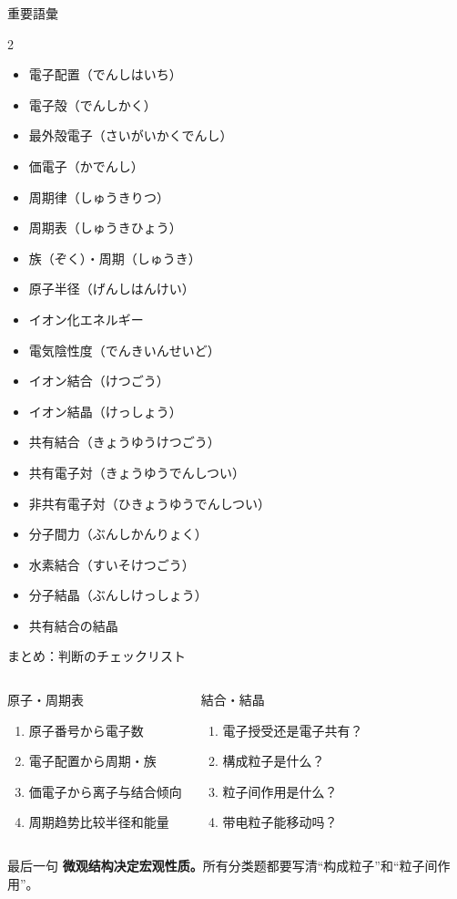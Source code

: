 \documentclass[notheorems,aspectratio=169]{beamer}
\newcommand{\jp}[1]{\textbf{\color{JapanBlue}#1}}
\begin{document}
\begin{frame}{重要語彙}
\small
\begin{multicols}{2}
\begin{itemize}
  \item 電子配置（でんしはいち）
  \item 電子殻（でんしかく）
  \item 最外殻電子（さいがいかくでんし）
  \item 価電子（かでんし）
  \item 周期律（しゅうきりつ）
  \item 周期表（しゅうきひょう）
  \item 族（ぞく）・周期（しゅうき）
  \item 原子半径（げんしはんけい）
  \item イオン化エネルギー
  \item 電気陰性度（でんきいんせいど）
  \item イオン結合（けつごう）
  \item イオン結晶（けっしょう）
  \item 共有結合（きょうゆうけつごう）
  \item 共有電子対（きょうゆうでんしつい）
  \item 非共有電子対（ひきょうゆうでんしつい）
  \item 分子間力（ぶんしかんりょく）
  \item 水素結合（すいそけつごう）
  \item 分子結晶（ぶんしけっしょう）
  \item 共有結合の結晶
\end{itemize}
\end{multicols}
\end{frame}

\begin{frame}{まとめ：判断のチェックリスト}
\begin{columns}[T,onlytextwidth]
\begin{block}{原子・周期表}
\begin{enumerate}
  \item 原子番号から電子数
  \item 電子配置から周期・族
  \item 価電子から离子与结合倾向
  \item 周期趋势比较半径和能量
\end{enumerate}
\end{block}
\begin{exampleblock}{結合・結晶}
\begin{enumerate}
  \item 電子授受还是電子共有？
  \item 構成粒子是什么？
  \item 粒子间作用是什么？
  \item 带电粒子能移动吗？
\end{enumerate}
\end{exampleblock}
\end{columns}
\begin{alertblock}{最后一句}
\centering \jp{微观结构决定宏观性质。}所有分类题都要写清“构成粒子”和“粒子间作用”。
\end{alertblock}
\end{frame}
\end{document}
